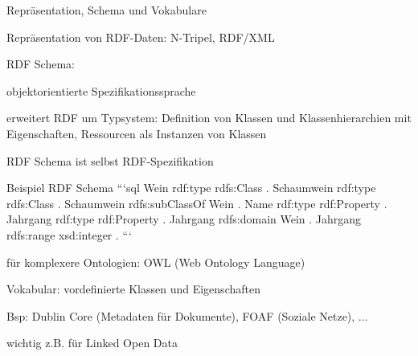 \documentclass[a4paper]{article}
\begin{document}
\begin{multicols}{3}
\begin{itemize*}
    Repräsentation, Schema und Vokabulare
    \begin{itemize*}
        \item Repräsentation von RDF-Daten: N-Tripel, RDF/XML
        \item RDF Schema:
        \begin{itemize*}
            \item objektorientierte Spezifikationssprache
            \item erweitert RDF um Typsystem: Definition von Klassen und Klassenhierarchien mit Eigenschaften, Ressourcen als Instanzen von Klassen
            \item RDF Schema ist selbst RDF-Spezifikation
        \end{itemize*}
        \item Beispiel RDF Schema
        ```sql
        Wein rdf:type rdfs:Class .
        Schaumwein rdf:type rdfs:Class .
        Schaumwein rdfs:subClassOf Wein .
        Name rdf:type rdf:Property .
        Jahrgang rdf:type rdf:Property .
        Jahrgang rdfs:domain Wein .
        Jahrgang rdfs:range xsd:integer .
        ```
        \item für komplexere Ontologien: OWL (Web Ontology Language)
        \item Vokabular: vordefinierte Klassen und Eigenschaften
        \begin{itemize*}
            \item Bsp: Dublin Core (Metadaten für Dokumente), FOAF (Soziale Netze), ...
            \item wichtig z.B. für Linked Open Data
        \end{itemize*}
    \end{itemize*}


\end{itemize*}
\end{multicols}
\end{document}
